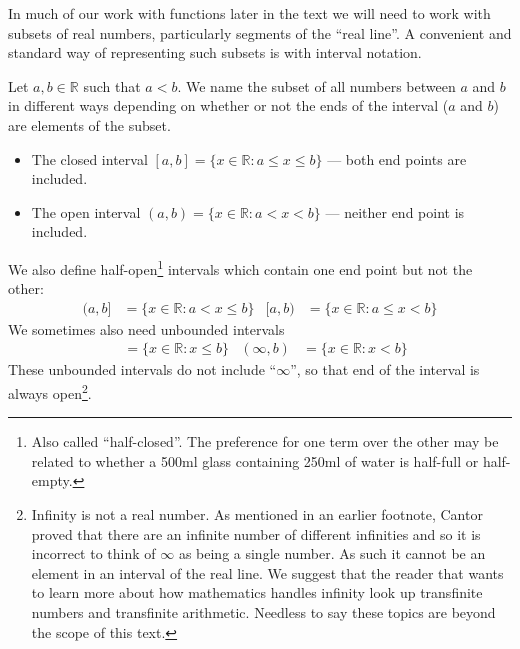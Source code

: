 In much of our work with functions later in the text we will need to work with
subsets of real numbers, particularly segments of the ``real line''. A
convenient and standard way of representing such subsets is with interval
notation.
\begin{defn} \label{def intervals}
  Let $a, b \in \mathbb{R}$ such that $a<b$. We name the subset of all
numbers between $a$ and $b$ in different ways depending on whether or not the
ends of the interval ($a$ and $b$) are elements of the subset.
  \begin{itemize}
   \item The closed interval $[a,b] = \{x \in \mathbb{R} : a \leq x \leq b\}$
--- both end points are included.
   \item The open interval $(a,b) = \{x \in \mathbb{R} : a < x < b\}$ ---
neither end point is included.
  \end{itemize}

  We also define half-open\protect\footnote{Also called ``half-closed''. The
preference
for one term over the other may be related to whether a 500ml glass containing
250ml of water is half-full or half-empty.} intervals which contain one
end point but not the other:
  \begin{align*}
  (a,b] &= \{ x \in \mathbb{R} : a < x \leq b\}
  & [a,b) &= \{ x \in \mathbb{R} : a \leq x < b\}
  \end{align*}
  We sometimes also need unbounded intervals
  \begin{align*}
  [a, \infty) &= \{ x \in \mathbb{R} : a \leq x \}
  & (a, \infty) &= \{ x \in \mathbb{R} : a < x \} \\
  (\infty, b] &= \{ x \in \mathbb{R} : x \leq b \}
  & (\infty, b) &= \{ x \in \mathbb{R} : x < b \}
  \end{align*}
  These unbounded intervals do not include ``$\infty$'', so that end of the
interval is always open\footnote{Infinity is
not a real number. As mentioned in an earlier footnote, Cantor proved that
there are an infinite number of different infinities and so it is incorrect
to think of $\infty$ as being a single number. As such it cannot be an element
in an interval of the real line. We suggest that the reader that wants to learn
more about how mathematics handles infinity look up transfinite numbers and
transfinite arithmetic. Needless to say these topics are beyond the scope of
this text.}.
\end{defn}


